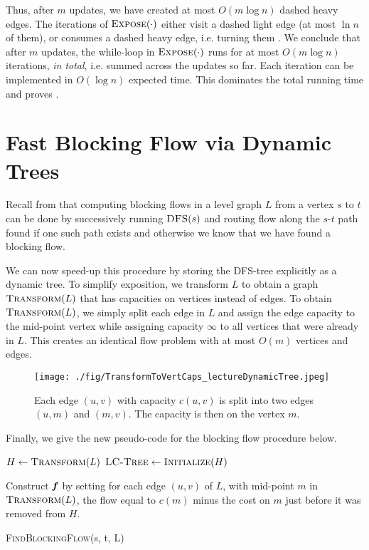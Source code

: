 Thus, after $m$ updates, we have created at most $O(m \log n)$ dashed heavy edges. The iterations of $\textsc{Expose}(\cdot)$ either visit a dashed light edge (at most $\ln n$ of them), or consumes a dashed heavy edge, i.e. turning them .
We conclude that after $m$ updates, the while-loop in $\textsc{Expose}(\cdot)$ runs for at most $O(m \log n)$ iterations, \emph{in total}, i.e. summed across the updates so far. Each iteration can be implemented in $O(\log n)$ expected time. This dominates the total running time and proves .

\section{Fast Blocking Flow via Dynamic Trees}

Recall from  that computing blocking flows in a level graph $L$ from a vertex $s$ to $t$ can be done by successively running $\textsc{DFS}(s)$ and routing flow along the $s$-$t$ path found if one such path exists and otherwise we know that we have found a blocking flow. 

We can now speed-up this procedure by storing the DFS-tree explicitly as a dynamic tree. To simplify exposition, we transform $L$ to obtain a graph $\textsc{Transform}(L)$ that has capacities on vertices instead of edges. To obtain $\textsc{Transform}(L)$, we simply split each edge in $L$ and assign the edge capacity to the mid-point vertex while assigning capacity $\infty$ to all vertices that were already in $L$. This creates an identical flow problem with at most $O(m)$ vertices and edges.

\begin{figure}[!ht]
    \centering
    \texttt{[image: ./fig/TransformToVertCaps\_lectureDynamicTree.jpeg]}
    \caption{Each edge $(u,v)$ with capacity $c(u,v)$ is split into two edges $(u,m)$ and $(m,v)$. The capacity is then on the vertex $m$.}
    \label{fig:my_label}
\end{figure}

Finally, we give the new pseudo-code for the blocking flow procedure below.

\begin{algorithm}[H]
  \SetAlgoLined
  $H \leftarrow \textsc{Transform}(L)$\;
  $\textsc{LC-Tree} \gets \textsc{Initialize}(H)$\;
  
  Construct $\boldsymbol{\mathit{f}}$ by setting for each edge $(u,v)$ of $L$, with mid-point $m$ in $\textsc{Transform}(L)$, the flow equal to $c(m)$ minus the cost on $m$ just before it was removed from $H$.
  \caption{\textsc{FindBlockingFlow}(s, t, L)}
\end{algorithm}

